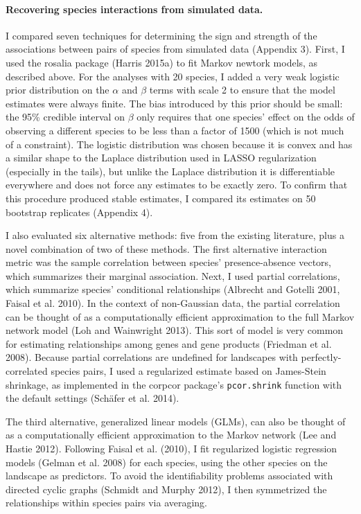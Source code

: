 \documentclass[12pt,]{article}
\begin{document}
\begin{spacing}{1.9}
\begin{flushleft}
\paragraph{Recovering species interactions from simulated
data.}\label{recovering-species-interactions-from-simulated-data.}

I compared seven techniques for determining the sign and strength of the
associations between pairs of species from simulated data (Appendix 3).
First, I used the rosalia package (Harris 2015a) to fit Markov newtork
models, as described above. For the analyses with 20 species, I added a
very weak logistic prior distribution on the \(\alpha\) and \(\beta\)
terms with scale 2 to ensure that the model estimates were always
finite. The bias introduced by this prior should be small: the 95\%
credible interval on \(\beta\) only requires that one species' effect on
the odds of observing a different species to be less than a factor of
1500 (which is not much of a constraint). The logistic distribution was
chosen because it is convex and has a similar shape to the Laplace
distribution used in LASSO regularization (especially in the tails), but
unlike the Laplace distribution it is differentiable everywhere and does
not force any estimates to be exactly zero. To confirm that this
procedure produced stable estimates, I compared its estimates on 50
bootstrap replicates (Appendix 4).

I also evaluated six alternative methods: five from the existing
literature, plus a novel combination of two of these methods. The first
alternative interaction metric was the sample correlation between
species' presence-absence vectors, which summarizes their marginal
association. Next, I used partial correlations, which summarize species'
conditional relationships (Albrecht and Gotelli 2001, Faisal et al.
2010). In the context of non-Gaussian data, the partial correlation can
be thought of as a computationally efficient approximation to the full
Markov network model (Loh and Wainwright 2013). This sort of model is
very common for estimating relationships among genes and gene products
(Friedman et al. 2008). Because partial correlations are undefined for
landscapes with perfectly-correlated species pairs, I used a regularized
estimate based on James-Stein shrinkage, as implemented in the corpcor
package's \texttt{pcor.shrink} function with the default settings
(Schäfer et al. 2014).

The third alternative, generalized linear models (GLMs), can also be
thought of as a computationally efficient approximation to the Markov
network (Lee and Hastie 2012). Following Faisal et al. (2010), I fit
regularized logistic regression models (Gelman et al. 2008) for each
species, using the other species on the landscape as predictors. To
avoid the identifiability problems associated with directed cyclic
graphs (Schmidt and Murphy 2012), I then symmetrized the relationships
within species pairs via averaging.


\end{flushleft}
\end{spacing}
\end{document}
